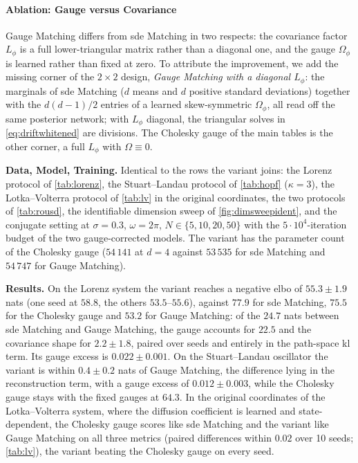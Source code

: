 \documentclass{article} %
\newcommand{\gauge}{\Omega}
\begin{document}
\paragraph{Ablation: Gauge versus Covariance}
\label{sec:ablationgauge}
Gauge Matching differs from \gls{sde} Matching in two respects: the covariance factor $L_\phi$ is a full lower-triangular matrix rather than a diagonal one, and the gauge $\gauge_\phi$ is learned rather than fixed at zero. To attribute the improvement, we add the missing corner of the $2 \times 2$ design, \emph{Gauge Matching with a diagonal $L_\phi$}: the marginals of \gls{sde} Matching ($d$ means and $d$ positive standard deviations) together with the $d(d-1)/2$ entries of a learned skew-symmetric $\gauge_\phi$, all read off the same posterior network; with $L_\phi$ diagonal, the triangular solves in \cref{eq:driftwhitened} are divisions. The Cholesky gauge of the main tables is the other corner, a full $L_\phi$ with $\gauge \equiv 0$.

\textbf{Data, Model, Training.} Identical to the rows the variant joins: the Lorenz protocol of \cref{tab:lorenz}, the Stuart--Landau protocol of \cref{tab:hopf} ($\kappa = 3$), the Lotka--Volterra protocol of \cref{tab:lv} in the original coordinates, the two protocols of \cref{tab:rousd}, the identifiable dimension sweep of \cref{fig:dimsweepident}, and the conjugate setting at $\sigma = 0.3$, $\omega = 2\pi$, $N \in \{5, 10, 20, 50\}$ with the $5 \cdot 10^4$-iteration budget of the two gauge-corrected models. The variant has the parameter count of the Cholesky gauge ($54\,141$ at $d = 4$ against $53\,535$ for \gls{sde} Matching and $54\,747$ for Gauge Matching).

\textbf{Results.} On the Lorenz system the variant reaches a negative \gls{elbo} of $55.3 \pm 1.9$ nats (one seed at $58.8$, the others $53.5$--$55.6$), against $77.9$ for \gls{sde} Matching, $75.5$ for the Cholesky gauge and $53.2$ for Gauge Matching: of the $24.7$ nats between \gls{sde} Matching and Gauge Matching, the gauge accounts for $22.5$ and the covariance shape for $2.2 \pm 1.8$, paired over seeds and entirely in the path-space \gls{kl} term. Its gauge excess is $0.022 \pm 0.001$. On the Stuart--Landau oscillator the variant is within $0.4 \pm 0.2$ nats of Gauge Matching, the difference lying in the reconstruction term, with a gauge excess of $0.012 \pm 0.003$, while the Cholesky gauge stays with the fixed gauges at $64.3$. In the original coordinates of the Lotka--Volterra system, where the diffusion coefficient is learned and state-dependent, the Cholesky gauge scores like \gls{sde} Matching and the variant like Gauge Matching on all three metrics (paired differences within $0.02$ over 10 seeds; \cref{tab:lv}), the variant beating the Cholesky gauge on every seed.
\end{document}
